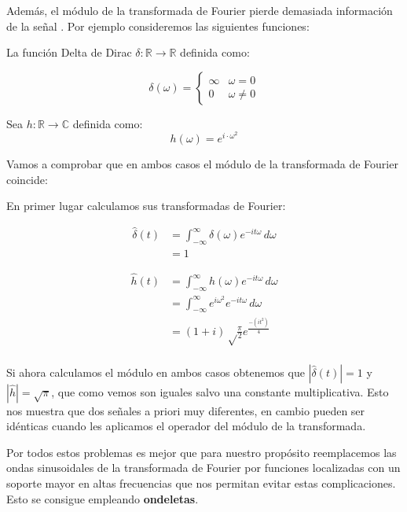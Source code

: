 \medskip

\noindent Además, el módulo de la transformada de Fourier pierde demasiada información de la señal \cite{bruna2013invariant}. Por ejemplo consideremos las siguientes funciones: 

\begin{definicion}
  La función Delta de Dirac $\delta: \mathbb{R} \rightarrow \mathbb{R}$ definida como:

  $$ \delta(\omega)= \begin{cases} 
    \infty & \omega=0 \\
    0 &  \omega \neq 0
 \end{cases}$$
  
\end{definicion}

\begin{definicion}
  Sea $h:\mathbb{R} \rightarrow \mathbb{C}$ definida como:
  $$h(\omega)=e^{i \cdot \omega^2}$$
\end{definicion}

\medskip

\noindent Vamos a comprobar que en ambos casos el módulo de la transformada de Fourier coincide:

\noindent En primer lugar calculamos sus transformadas de Fourier: 

\begin{align*}
  \widehat{\delta}(t)& =\int_{- \infty}^{\infty} \delta(\omega) e^{-i t \omega }  \,d\omega \\
& = 1
\end{align*}

\begin{align*}
  \widehat{h}(t)& =\int_{- \infty}^{\infty} h(\omega) e^{-i t \omega }  \,d\omega \\
& =\int_{- \infty}^{\infty} e^{i \omega^2} e^{-i t \omega }  \,d\omega \\
& =(1 + i) \sqrt\frac{\pi}{2} e^{\frac{-(i t^2)}{4}}\\
\end{align*}


\noindent Si ahora calculamos el módulo en ambos casos obtenemos que $|\widehat{\delta}(t)|=1$ y $|\widehat{h}|=\sqrt{\pi}$, que como vemos son iguales salvo una constante multiplicativa. Esto nos muestra que dos señales a priori muy diferentes, en cambio pueden ser idénticas cuando les aplicamos el operador del módulo de la transformada.

\medskip

\noindent Por todos estos problemas es mejor que para nuestro propósito reemplacemos las ondas sinusoidales de la transformada de Fourier por funciones localizadas con un soporte mayor en altas frecuencias que nos permitan evitar estas complicaciones. Esto se consigue empleando \textbf{ondeletas}. 

